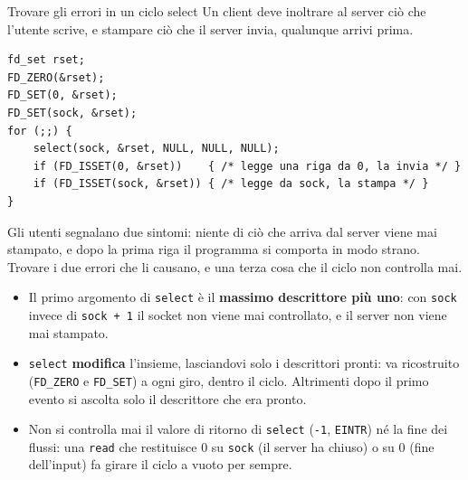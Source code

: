 \begin{esercizio}{Trovare gli errori in un ciclo select}
Un client deve inoltrare al server ciò che l'utente scrive, e stampare ciò che il server invia, qualunque arrivi prima.
\begin{lstlisting}[language={[POSIX]C}]
fd_set rset;
FD_ZERO(&rset);
FD_SET(0, &rset);
FD_SET(sock, &rset);
for (;;) {
    select(sock, &rset, NULL, NULL, NULL);
    if (FD_ISSET(0, &rset))    { /* legge una riga da 0, la invia */ }
    if (FD_ISSET(sock, &rset)) { /* legge da sock, la stampa */ }
}
\end{lstlisting}
Gli utenti segnalano due sintomi: niente di ciò che arriva dal server viene mai stampato, e dopo la prima riga il programma si comporta
in modo strano. Trovare i due errori che li causano, e una terza cosa che il ciclo non controlla mai.

\svolgimento
\begin{itemize}
    \item Il primo argomento di \texttt{select} è il \textbf{massimo descrittore più uno}: con \texttt{sock} invece di \texttt{sock + 1} il
          socket non viene mai controllato, e il server non viene mai stampato.
    \item \texttt{select} \textbf{modifica} l'insieme, lasciandovi solo i descrittori pronti: va ricostruito (\texttt{FD\_ZERO} e
          \texttt{FD\_SET}) a ogni giro, dentro il ciclo. Altrimenti dopo il primo evento si ascolta solo il descrittore che era pronto.
    \item Non si controlla mai il valore di ritorno di \texttt{select} (\texttt{-1}, \texttt{EINTR}) né la fine dei flussi: una
          \texttt{read} che restituisce 0 su \texttt{sock} (il server ha chiuso) o su 0 (fine dell'input) fa girare il ciclo a vuoto per
          sempre.
\end{itemize}
\end{esercizio}

